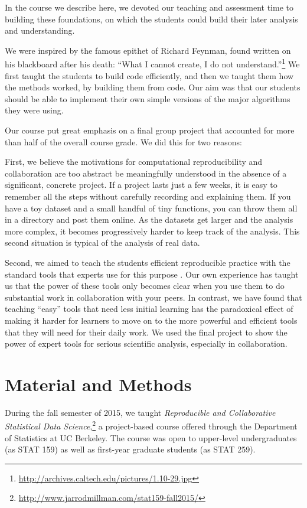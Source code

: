 In the course we describe here, we devoted our teaching and assessment time to
building these foundations, on which the students could build their later
analysis and understanding.

We were inspired by the famous epithet of Richard Feynman, found written on
his blackboard after his death: ``What I cannot create, I do not
understand.''\footnote{\url{http://archives.caltech.edu/pictures/1.10-29.jpg}}
We first taught the students to build code efficiently, and then we taught
them how the methods worked, by building them from code.  Our aim was that our
students should be able to implement their own simple versions of the major
algorithms they were using.

Our course put great emphasis on a final group project that accounted for more
than half of the overall course grade.  We did this for two reasons:

First, we believe the motivations for computational reproducibility and
collaboration are too abstract be meaningfully understood in the absence of a
significant, concrete project.
If a project lasts
just a few weeks, it is easy to remember all the steps without carefully
recording and explaining them.  If you have a toy dataset and a small handful
of tiny functions, you can throw them all in a directory and post them online.
As the datasets get larger and the analysis more complex, it becomes
progressively harder to keep track of the analysis.  This second situation is
typical of the analysis of real data.

Second, we aimed to teach the students efficient reproducible practice with
the standard tools that experts use for this purpose
\citep{millman2014developing}. Our own experience has taught us that the power
of these tools only becomes clear when you use them to do substantial work in
collaboration with your peers.  In contrast, we have found that teaching
``easy'' tools that need less initial learning has the paradoxical effect of
making it harder for learners to move on to the more powerful and efficient
tools that they will need for their daily work.  We used the final project to
show the power of expert tools for serious scientific analysis, especially in
collaboration.

\section{Material and Methods}\label{methods}

During the fall semester of 2015, we taught \emph{Reproducible and Collaborative
Statistical Data Science},\footnote{\url{http://www.jarrodmillman.com/stat159-fall2015/}}
a project-based course offered through the Department of Statistics at UC Berkeley.
The course was open to upper-level undergraduates (as STAT 159) as well as
first-year graduate students (as STAT 259).

